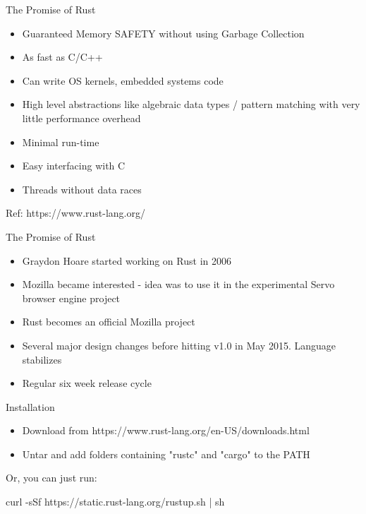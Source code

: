 \documentclass{beamer}
\begin{document}
\begin{frame}{The Promise of Rust}

\begin{itemize}

\item Guaranteed Memory SAFETY without using
      Garbage Collection

\item As fast as C/C++
\item Can write OS kernels, embedded systems code
\item High level abstractions like algebraic data
      types / pattern matching with very little 
      performance overhead
\item Minimal run-time
\item Easy interfacing with C
\item Threads without data races

\end{itemize}

Ref: https://www.rust-lang.org/

\end{frame}
\begin{frame}{The Promise of Rust}

\begin{itemize}

\item Graydon Hoare started working on Rust in 2006

\item Mozilla  became interested - idea was to use it
in the experimental Servo browser engine project

\item Rust becomes an official Mozilla project

\item Several major design changes before hitting v1.0 in
May 2015. Language stabilizes

\item Regular six week release cycle

\end{itemize}

\end{frame}
\begin{frame}{Installation}

\begin{itemize}

\item Download from https://www.rust-lang.org/en-US/downloads.html

\item Untar and add folders containing "rustc" and "cargo" to the PATH

\end{itemize}

Or, you can just run:

curl -sSf https://static.rust-lang.org/rustup.sh | sh

\end{frame}
\end{document}
